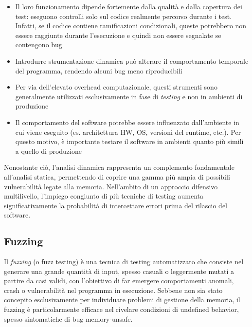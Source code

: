 \begin{itemize}
  \item Il loro funzionamento dipende fortemente dalla qualità e dalla copertura
    dei test: eseguono controlli solo sul codice realmente percorso durante i
    test. Infatti, se il codice contiene ramificazioni condizionali, queste potrebbero
    non essere raggiunte durante l'esecuzione e quindi non essere segnalate se contengono
    bug

  \item Introdurre strumentazione dinamica può alterare il comportamento temporale
    del programma, rendendo alcuni bug meno riproducibili

  \item Per via dell'elevato overhead computazionale, questi strumenti sono
    generalmente utilizzati esclusivamente in fase di \textit{testing} e non in ambienti
    di produzione

  \item Il comportamento del software potrebbe essere influenzato dall'ambiente in
    cui viene eseguito (es. architettura HW, OS, versioni del runtime, etc.). Per
    questo motivo, è importante testare il software in ambienti quanto più
    simili a quello di produzione
\end{itemize}

Nonostante ciò, l'analisi dinamica rappresenta un complemento fondamentale all'analisi
statica, permettendo di coprire una gamma più ampia di possibili vulnerabilità legate
alla memoria. Nell'ambito di un approccio difensivo multilivello, l'impiego congiunto
di più tecniche di testing aumenta significativamente la probabilità di intercettare
errori prima del rilascio del software.

\subsection{Fuzzing}
\label{sec:fuzzing}

Il \textit{fuzzing} (o fuzz testing) è una tecnica di testing automatizzato che consiste
nel generare una grande quantità di input, spesso casuali o leggermente mutati a
partire da casi validi, con l'obiettivo di far emergere comportamenti anomali,
crash o vulnerabilità nel programma in esecuzione. Sebbene non sia stato concepito
esclusivamente per individuare problemi di gestione della memoria, il fuzzing è
particolarmente efficace nel rivelare condizioni di undefined behavior, spesso sintomatiche
di bug memory-unsafe.

